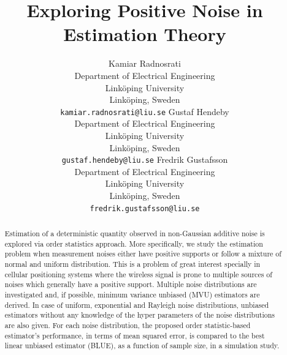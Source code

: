 \documentclass{article}
\title{Exploring Positive Noise in Estimation Theory}
\author{Kamiar Radnosrati \\  Department of Electrical Engineering\\
  		  Link\"oping University\\Link\"oping, Sweden\\ \texttt{kamiar.radnosrati@liu.se} 
  		 \And Gustaf Hendeby \\ Department of Electrical Engineering\\
  		 Link\"oping University\\Link\"oping, Sweden\\\texttt{gustaf.hendeby@liu.se}  \And Fredrik Gustafsson\\  Department of Electrical Engineering\\
  		 Link\"oping University\\Link\"oping, Sweden\\\texttt{fredrik.gustafsson@liu.se} }
\begin{document}
\maketitle

\begin{abstract}
Estimation of a deterministic quantity observed in non-Gaussian additive noise is explored via order statistics approach.  More specifically, we study the estimation problem when measurement noises either have positive supports or follow a mixture of normal and uniform distribution. This is a problem of great interest specially in cellular positioning systems where the wireless signal is prone to multiple sources of noises which generally have a positive support. Multiple noise distributions are investigated and, if possible, minimum variance unbiased (MVU) estimators are derived. In case of uniform, exponential and Rayleigh noise distributions, unbiased estimators without any knowledge of the hyper parameters of the noise distributions are also given. For each noise distribution, the proposed order statistic-based estimator's performance, in terms of  mean squared error, is compared to the best linear unbiased estimator (BLUE), as a function of sample size, in a simulation study.
\end{abstract}



\end{document}
